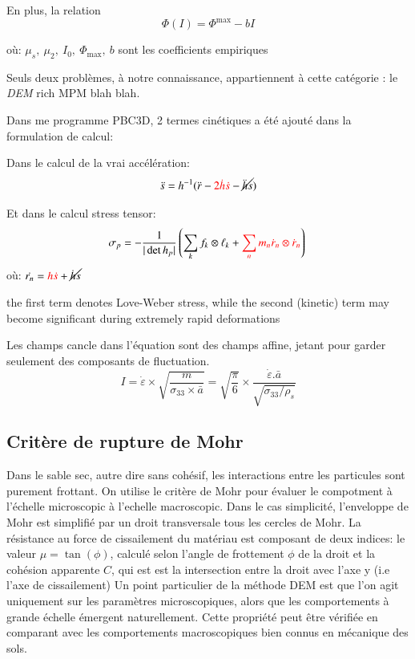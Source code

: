 \documentclass[5p,authoryear,square]{elsarticle}
\begin{document}
En plus, la relation 
\begin{equation}
\Phi(I) = \Phi^{\max} - bI
\label{phiI}
\end{equation}

où: $\mu_s,\ \mu_2,\ I_0,\ \Phi_{\text{max}},\ b $ sont les coefficients empiriques

Seuls deux problèmes, à notre connaissance, appartiennent à cette catégorie : le \emph{DEM} rich MPM blah blah.

Dans me programme PBC3D, 2 termes cinétiques a été ajouté  dans la formulation de calcul:


Dans le calcul de la vrai accélération: 
\begin{equation}
\ddot{s} = h^{-1}(\ddot{r} - \textcolor{red}{2\dot{h}\dot{s}} - \cancel{\ddot{h}s})
    \label{eq:vraiAcc}
\end{equation}	


Et dans le calcul stress tensor: 
\begin{equation}
    \sigma_p = -\frac{1}{|\det h_p|} \left( \sum_k f_k \otimes \ell_k + \textcolor{red}{\sum_n m_n \dot{r}_n \otimes \dot{r}_n} \right) \\
    \label{eq:contrainteDynamique}
\end{equation}	
    où: $\dot{r_n} = \textcolor{red}{h\dot{s}} + \cancel{\dot{h}s}$

the first term denotes Love-Weber stress, while the
second (kinetic) term may become significant during extremely rapid deformations

Les champs cancle dans l'équation sont des champs affine, jetant pour garder seulement des composants de fluctuation.
\begin{equation}
    I = \dot{\varepsilon} \times \sqrt{\frac{m}{\sigma_{33} \times \bar{a}}}
 = \sqrt{\frac{\pi}{6}} \times \frac{\dot{\varepsilon} .\bar{a}}{\sqrt{\sigma_{33}/\rho_s}}
    \label{eq:placeholder_label}
\end{equation}



\subsection{Critère de rupture de Mohr} \label{Mohr}
Dans le sable sec, autre dire sans cohésif, les interactions entre les particules sont purement frottant. 
On utilise le critère de Mohr pour évaluer le compotment à l'échelle microscopic à l'echelle macroscopic.
Dans le cas simplicité, l'enveloppe de Mohr est simplifié par un droit transversale tous les cercles de Mohr.
La résistance au force de cissailement du matériau est composant de deux indices: le valeur $\mu = \tan(\phi)$, calculé selon l'angle de frottement $\phi$ de la droit et la cohésion apparente $C$, qui est est la intersection entre la droit avec l'axe y (i.e l'axe de cissailement)
Un point particulier de la méthode DEM est que l’on agit uniquement sur les paramètres microscopiques, alors que les comportements à grande échelle émergent naturellement.  
Cette propriété peut être vérifiée en comparant avec les comportements macroscopiques bien connus en mécanique des sols.  
\end{document}
